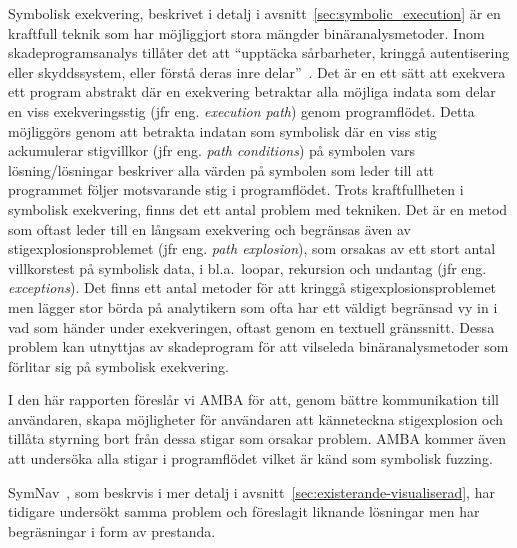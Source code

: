 Symbolisk exekvering, beskrivet i detalj i avsnitt~\ref{sec:symbolic_execution}
är en kraftfull teknik som har möjliggjort stora mängder
binäranalysmetoder\cite{survey_symb_exc, symnav}. Inom skadeprogramsanalys
tillåter det att ``upptäcka sårbarheter, kringgå autentisering eller
skyddssystem, eller förstå deras inre delar''~\cite{symnav}. Det är en ett sätt
att exekvera ett program abstrakt där en exekvering betraktar alla möjliga
indata som delar en viss exekveringsstig (jfr eng. \emph{execution path}) genom
programflödet. Detta möjliggörs genom att betrakta indatan som symbolisk där en
viss stig ackumulerar stigvillkor (jfr eng. \emph{path conditions}) på symbolen
vars lösning/lösningar beskriver alla värden på symbolen som leder till att
programmet följer motsvarande stig i programflödet. Trots kraftfullheten i
symbolisk exekvering, finns det ett antal problem med tekniken. Det är en metod
som oftast leder till en långsam exekvering och begränsas även av
stigexplosionsproblemet (jfr eng. \emph{path explosion}), som orsakas av ett
stort antal villkorstest på symbolisk data, i bl.a.\ loopar, rekursion och
undantag (jfr eng. \emph{exceptions}). Det finns ett antal metoder för att
kringgå stigexplosionsproblemet men lägger stor börda på analytikern som ofta
har ett väldigt begränsad vy in i vad som händer under exekveringen, oftast
genom en textuell gränssnitt. Dessa problem kan utnyttjas av skadeprogram för
att vilseleda binäranalysmetoder som förlitar sig på symbolisk exekvering.

I den här rapporten föreslår vi AMBA för att, genom bättre kommunikation till
användaren, skapa möjligheter för användaren att känneteckna stigexplosion och
tillåta styrning bort från dessa stigar som orsakar problem. AMBA kommer även
att undersöka alla stigar i programflödet vilket är känd som symbolisk fuzzing.

SymNav~\cite{symnav}, som beskrvis i mer detalj i
avsnitt~\ref{sec:existerande-visualiserad}, har tidigare undersökt samma problem och
föreslagit liknande lösningar men har begräsningar i form av prestanda.



